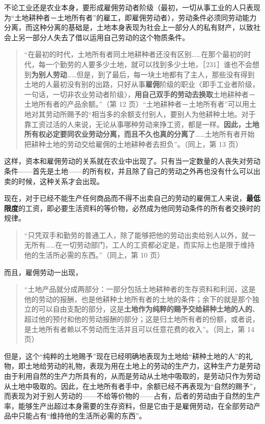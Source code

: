 不论工业还是农业本身，要形成雇佣劳动者阶级（最初，一切从事工业的人只表现为“土地耕种者－土地所有者”的雇工，即雇佣劳动者），劳动条件必须同劳动能力分离，而这种分离的基础是，土地本身表现为社会上一部分人的私有财产，以致社会上另一部分人失去了借以运用自己劳动的这个物质条件。

\begin{quote}“在最初的时代，土地所有者同土地耕种者还没有区别……在那个最初的时代，每一个勤劳的人要多少土地，就可以找到多少土地，［231］谁也不会想到\textbf{为别人劳动}……但是，到了最后，每一块土地都有了主人，那些没有得到土地的人最初没有别的出路，只好从事\textbf{雇佣}阶级的职业〈即手工业者阶级，一句话，一切非农业劳动者阶级〉，\textbf{用自己双手的劳动去换取}土地耕种者－土地所有者的产品余额。”（第 12 页）“土地耕种者－土地所有者”可以用土地对其劳动所赐予的“相当多的余额支付别人，要别人为他耕种土地。对于靠工资过活的人来说，无论从事哪种劳动来挣工资，都是一样。\textbf{因此，土地所有权必定要同农业劳动分离，而且不久也真的分离了}……土地所有者开始把耕种土地的劳动交给雇佣的土地耕种者去担负”。（同上，第 13 页）\end{quote}

这样，资本和雇佣劳动的关系就在农业中出现了。只有当一定数量的人丧失对劳动条件——首先是土地——的所有权，并且除了自己的劳动之外再也没有什么可以出卖的时候，这种关系才会出现。

现在，对于已经不能生产任何商品而不得不出卖自己的劳动的雇佣工人来说，\textbf{最低限度}的工资，即必要生活资料的等价物，必然成为他同劳动条件的所有者交换时的规律。

\begin{quote}“只凭双手和勤劳的普通工人，除了能够把他的劳动出卖给别人以外，就一无所有……在一切劳动部门，工人的工资都必定是，而实际上也是限于维持他的生活所必需的东西。”（同上，第 10 页）\end{quote}

而且，雇佣劳动一出现，

\begin{quote}“土地产品就分成两部分：一部分包括土地耕种者的生存资料和利润，这是他的劳动的报酬，也是他耕种土地所有者的土地的条件；余下的就是那个独立的可以自由支配的部分，这是\textbf{土地作为纯粹的赐予交给耕种土地的人的}、超过他的预付和他的劳动报酬的部分；这是归土地所有者的份额，或者说，是土地所有者赖以不劳动而生活并且可以任意花费的收入”。（同上，第 14 页）\end{quote}

但是，这个“纯粹的土地赐予”现在已经明确地表现为土地给“耕种土地的人”的礼物，即土地给劳动的礼物，表现为用在土地上的劳动的生产力，这种生产力是劳动由于利用自然的生产力所具有的，从而是劳动从土地中吸取的，是劳动只作为劳动从土地中吸取的。因此，在土地所有者手中，余额已经不再表现为“自然的赐予”，而表现为对于别人劳动的——不给等价物的——占有，后者的劳动由于自然的生产率，能够生产出超过本身需要的生存资料，但是它由于是雇佣劳动，在全部劳动产品中只能占有“维持他的生活所必需的东西”。


